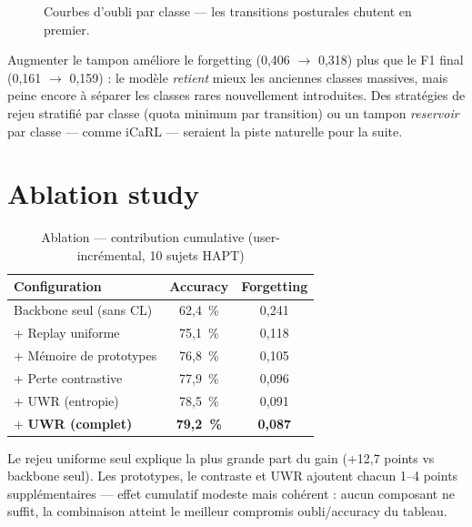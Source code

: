 \begin{figure}[H]
  \centering
  \caption[Oubli class-incrémental par classe]{Courbes d'oubli par classe — les
  transitions posturales chutent en premier.}
  \label{fig:forgetting_class_eval}
\end{figure}

Augmenter le tampon améliore le forgetting (0,406 $\rightarrow$ 0,318) plus que
le F1 final (0,161 $\rightarrow$ 0,159) : le modèle \emph{retient} mieux les
anciennes classes massives, mais peine encore à séparer les classes rares
nouvellement introduites. Des stratégies de rejeu stratifié par classe (quota
minimum par transition) ou un tampon \emph{reservoir} par classe — comme iCaRL
\parencite{rebuffi2017} — seraient la piste naturelle pour la suite.

\section{Ablation study}

\begin{table}[H]
\centering
\small
\begin{tabularx}{\textwidth}{|Y|c|c|}
\hline
\textbf{Configuration} & \textbf{Accuracy} & \textbf{Forgetting} \\
\hline
Backbone seul (sans CL)        & 62,4~\% & 0,241 \\
+ Replay uniforme              & 75,1~\% & 0,118 \\
+ Mémoire de prototypes        & 76,8~\% & 0,105 \\
+ Perte contrastive            & 77,9~\% & 0,096 \\
+ UWR (entropie)               & 78,5~\% & 0,091 \\
+ \textbf{UWR (complet)}       & \textbf{79,2~\%} & \textbf{0,087} \\
\hline
\end{tabularx}
\caption{Ablation — contribution cumulative (user-incrémental, 10 sujets HAPT)}
\label{tab:ablation}
\end{table}

Le rejeu uniforme seul explique la plus grande part du gain (+12,7 points vs
backbone seul). Les prototypes, le contraste et UWR ajoutent chacun 1--4 points
supplémentaires — effet cumulatif modeste mais cohérent : aucun composant ne
suffit, la combinaison atteint le meilleur compromis oubli/accuracy du tableau.

